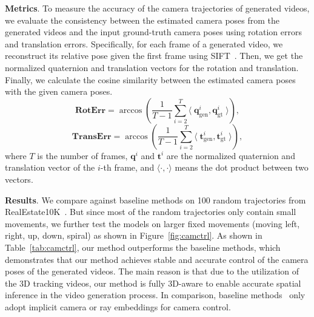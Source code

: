 \noindent\textbf{Metrics}. To measure the accuracy of the camera trajectories of generated videos, we evaluate the consistency between the estimated camera poses from the generated videos and the input ground-truth camera poses using rotation errors and translation errors.
Specifically, for each frame of a generated video, we reconstruct its relative pose given the first frame using SIFT~\cite{ng2003sift}. Then, we get the normalized quaternion and translation vectors for the rotation and translation. Finally, we calculate the cosine similarity between the estimated camera poses with the given camera poses.
\[
\mathbf{RotErr} = \arccos\left(\frac{1}{T-1} \sum_{i=2}^{T} \langle \;\mathbf{q}_{\mathrm{gen}}^i , \mathbf{q}_{\mathrm{gt}}^i \;\rangle\right),
\]
\[
\mathbf{TransErr} = \arccos \left(\frac{1}{T-1} \sum_{i=2}^{T} \langle\; \mathbf{t}_{\mathrm{gen}}^i , \mathbf{t}_{\mathrm{gt}}^i \;\rangle\right),
\]
where $T$ is the number of frames, $\mathbf{q}^{i}$ and $\mathbf{t}^{i}$ are the normalized quaternion and translation vector of the $i$-th frame, and $\langle \cdot, \cdot \rangle$ means the dot product between two vectors.



\noindent\textbf{Results}.
We compare against baseline methods on 100 random trajectories from RealEstate10K~\cite{zhou2018stereo}. But since most of the random trajectories only contain small movements, we further test the models on larger fixed movements (moving left, right, up, down, spiral) as shown in Figure~\ref{fig:camctrl}. As shown in Table~\ref{tab:camctrl}, our method outperforms the baseline methods, which demonstrates that our method achieves stable and accurate control of the camera poses of the generated videos. The main reason is that due to the utilization of the 3D tracking videos, our method is fully 3D-aware to enable accurate spatial inference in the video generation process. In comparison, baseline methods~\cite{he2024cameractrl,wang2024motionctrl} only adopt implicit camera or ray embeddings for camera control.


